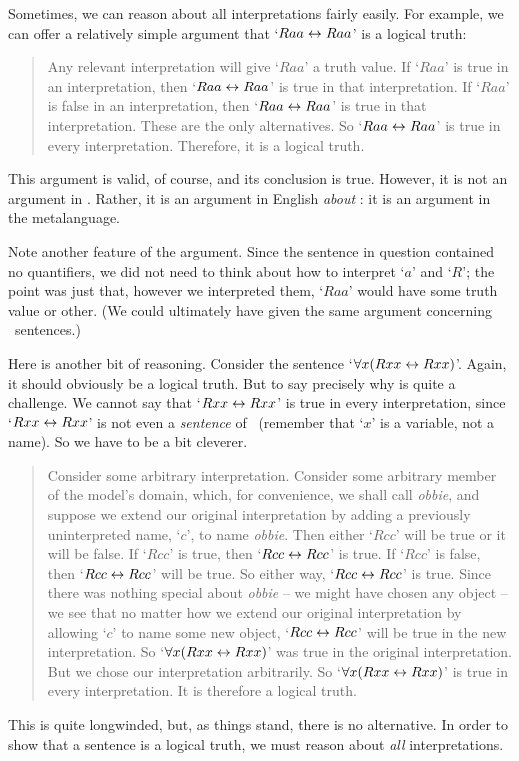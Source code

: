 \begin{earg}
Sometimes, we can reason about all interpretations fairly easily. For example, we can offer a relatively simple argument that `$Raa\leftrightarrow Raa$' is a logical truth:
	\begin{quote}
		\label{allmodels1}
		Any relevant interpretation will give `$Raa$' a truth value. If `$Raa$' is true in an interpretation, then `$Raa \leftrightarrow Raa$' is true in that interpretation. If `$Raa$' is false in an interpretation, then `$Raa \leftrightarrow Raa$' is true in that interpretation. These are the only alternatives. So `$Raa \leftrightarrow Raa$' is true in every interpretation. Therefore, it is a logical truth.
	\end{quote}
This argument is valid, of course, and its conclusion is true. However, it is not an argument in \FOL. Rather, it is an argument in English \emph{about} \FOL: it is an argument in the metalanguage. 

Note another feature of the argument. Since the sentence in question contained no quantifiers, we did not need to think about how to interpret `$a$' and `$R$'; the point was just that, however we interpreted them, `$Raa$' would have some truth value or other. (We could ultimately have given the same argument concerning \TFL\ sentences.)

Here is another bit of reasoning. Consider the sentence `$\forall x(Rxx\leftrightarrow Rxx)$'. Again, it should obviously be a logical truth. But to say precisely why is quite a challenge. We cannot say that `$Rxx \leftrightarrow Rxx$' is true in every interpretation, since `$Rxx \leftrightarrow Rxx$' is not even a \emph{sentence} of \FOL\ (remember that `$x$' is a variable, not a name). So we have to be a bit cleverer. 
	\begin{quote}
		Consider some arbitrary interpretation. Consider some arbitrary member of the model's domain, which, for convenience, we shall call \emph{obbie}, and suppose we extend our original interpretation by adding a previously uninterpreted name, `$c$', to name \emph{obbie}. Then either `$Rcc$' will be true or it will be false. If `$Rcc$' is true, then `$Rcc \leftrightarrow Rcc$' is true. If `$Rcc$' is false, then `$Rcc \leftrightarrow Rcc$' will be true. So either way, `$Rcc \leftrightarrow Rcc$' is true. Since there was nothing special about \emph{obbie} – we might have chosen any object – we see that no matter how we extend our original interpretation by allowing `$c$' to name some new object, `$Rcc \leftrightarrow Rcc$' will be true in the new interpretation. So `$\forall x (Rxx \leftrightarrow Rxx)$' was true in the original interpretation. But we chose our interpretation arbitrarily. So `$\forall x (Rxx \leftrightarrow Rxx)$' is true in every interpretation. It is therefore a logical truth.
	\end{quote}
This is quite longwinded, but, as things stand, there is no alternative. In order to show that a sentence is a logical truth, we must reason about \emph{all} interpretations. 


\end{earg}
